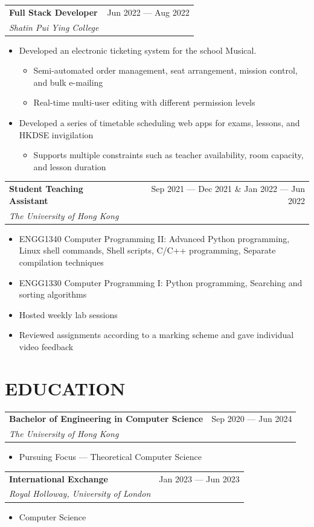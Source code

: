 \documentclass{article}
\newcommand{\jobTitle}[3]{
\vspace{0.4cm}
\begin{tabularx}{0.99\linewidth}{ X r }
    \textbf{#1} & #2\\
    \textit{#3} &
\end{tabularx}
\vspace{0.2cm}
}
\newenvironment{descitemize}
{ \begin{itemize}[leftmargin=1.4cm,,topsep=0pt]
    \setlength{\parskip}{0pt}
    \setlength{\parsep}{0pt}     }
{ \end{itemize}                  }
\begin{document}
\jobTitle
{Full Stack Developer}
{Jun 2022 --- Aug 2022}
{Shatin Pui Ying College}
\begin{descitemize}
    \item Developed an electronic ticketing system for the school Musical.
    \begin{itemize}
        \item Semi-automated order management, seat arrangement, mission control, and bulk e-mailing
        \item Real-time multi-user editing with different permission levels
    \end{itemize}
    \item Developed a series of timetable scheduling web apps for exams, lessons, and HKDSE invigilation
    \begin{itemize}
        \item Supports multiple constraints such as teacher availability, room capacity, and lesson duration
    \end{itemize}
\end{descitemize}

\jobTitle
{Student Teaching Assistant}
{Sep 2021 --- Dec 2021 \& Jan 2022 --- Jun 2022}
{The University of Hong Kong}
\begin{descitemize}
    \item ENGG1340 Computer Programming II: Advanced Python programming, Linux shell commands, Shell scripts, C/C++ programming, Separate compilation techniques
    \item ENGG1330 Computer Programming I: Python programming, Searching and sorting algorithms
    \item Hosted weekly lab sessions
    \item Reviewed assignments according to a marking scheme and gave individual video feedback
\end{descitemize}

\section{EDUCATION}

\jobTitle
{Bachelor of Engineering in Computer Science}
{Sep 2020 --- Jun 2024}
{The University of Hong Kong}
\begin{descitemize}
    \item Pursuing Focus --- Theoretical Computer Science
\end{descitemize}

\jobTitle
{International Exchange}
{Jan 2023 --- Jun 2023}
{Royal Holloway, University of London}
\begin{descitemize}
    \item Computer Science
\end{descitemize}
\end{document}

